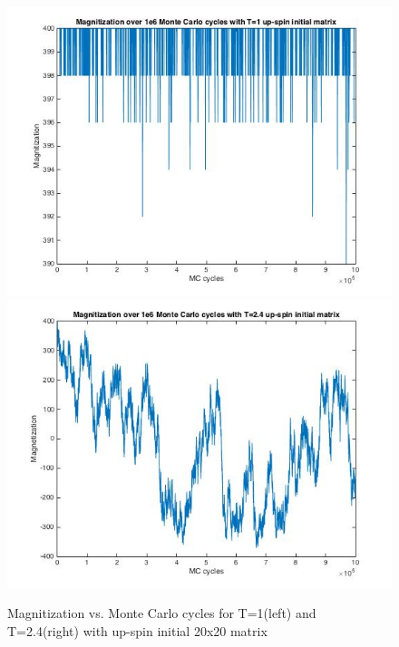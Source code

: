 \documentclass[10pt,a4paper]{article}
\begin{document}
\begin{figure}[H]
\centerline{
\includegraphics[scale=0.4]{magn20_1e6mc_T=1_up}
\includegraphics[scale=0.4]{magn20_1e6mc_T24_up}
}
\caption{Magnitization vs. Monte Carlo cycles for T=1(left) and T=2.4(right) with up-spin initial 20x20 matrix}
\label{fig:magn_20_1e6_up}
\end{figure}
\end{document}
